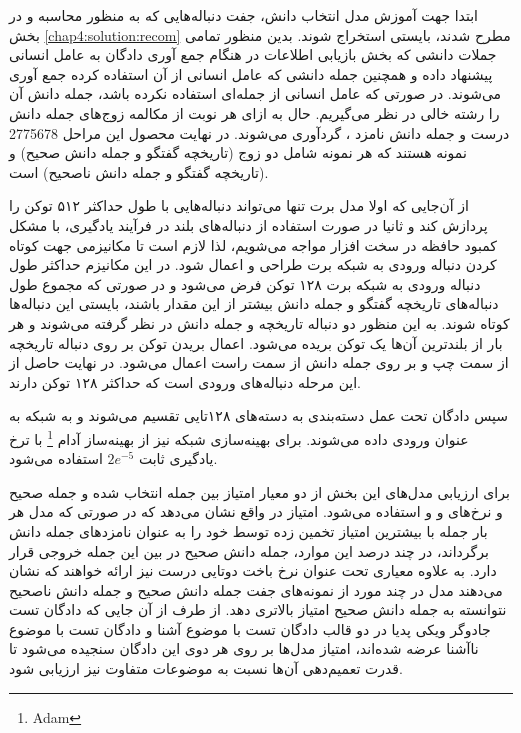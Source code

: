  ابتدا جهت آموزش مدل انتخاب دانش،‌ جفت دنباله‌هایی که به منظور محاسبه 
 و
 در بخش 
 \ref{chap4:solution:recom}
 مطرح شدند، بایستی استخراج شوند. بدین منظور تمامی جملات دانشی که بخش بازیابی اطلاعات در هنگام جمع آوری دادگان به عامل انسانی پیشنهاد داده و همچنین جمله دانشی که عامل انسانی از آن استفاده کرده جمع آوری می‌شوند. در صورتی که عامل انسانی از جمله‌ای استفاده نکرده باشد،‌ جمله دانش آن را رشته خالی در نظر می‌گیریم. حال به ازای هر نوبت از مکالمه زوج‌های جمله دانش درست و جمله دانش نامزد ، گردآوری می‌شوند. در نهایت محصول این مراحل 2775678 نمونه هستند که هر نمونه شامل دو زوج (تاریخچه گفتگو و جمله دانش صحیح) و (تاریخچه گفتگو و جمله دانش ناصحیح) است. 
 

از آن‌جایی که اولا مدل برت تنها می‌تواند دنباله‌هایی با طول حداکثر ۵۱۲ توکن را پردازش کند و ثانیا در صورت استفاده از دنباله‌های بلند در فرآیند یادگیری، با مشکل کمبود حافظه در سخت افزار مواجه می‌شویم، لذا لازم است تا مکانیزمی جهت کوتاه کردن دنباله ورودی به شبکه برت طراحی و اعمال شود. در این مکانیزم حداکثر طول دنباله ورودی به شبکه برت ۱۲۸ توکن فرض می‌شود و در صورتی که مجموع طول دنباله‌های تاریخچه گفتگو و جمله دانش بیشتر از این مقدار باشند، بایستی این دنباله‌ها کوتاه شوند. به این منظور دو دنباله تاریخچه و جمله دانش در نظر گرفته می‌شوند و هر بار از بلندترین آن‌ها یک توکن بریده می‌شود. اعمال بریدن توکن بر روی دنباله تاریخچه از سمت چپ و بر روی جمله دانش از سمت راست اعمال می‌شود. در نهایت حاصل از این مرحله دنباله‌های ورودی است که حداکثر ۱۲۸ توکن دارند. 

سپس دادگان تحت عمل دسته‌بندی به دسته‌های ۱۲۸تایی تقسیم می‌شوند و به شبکه به عنوان ورودی داده می‌شوند. برای بهینه‌سازی شبکه نیز از بهینه‌ساز آدام
\footnote{Adam}
با ترخ یادگیری ثابت 
$2e^{-5}$
استفاده می‌شود.

برای ارزیابی مدل‌های این بخش از دو معیار امتیاز
بین جمله انتخاب شده و جمله صحیح
و نرخ‌های 
 و  و 
استفاده می‌شود. امتیاز
در واقع نشان می‌دهد که در صورتی که مدل هر بار 
جمله  با بیشترین امتیاز تخمین زده توسط خود را به عنوان نامزد‌های جمله دانش برگرداند، در چند درصد این موارد، جمله دانش صحیح در بین این 
جمله خروجی قرار دارد. 
به علاوه معیاری تحت عنوان نرخ باخت دوتایی درست نیز ارائه خواهند که نشان می‌دهند مدل در چند مورد از نمونه‌های جفت جمله دانش صحیح و جمله دانش ناصحیح نتوانسته به جمله دانش صحیح امتیاز بالاتری دهد. 
از طرف از آن‌ جایی که دادگان تست جادوگر ویکی پدیا در دو قالب دادگان تست با موضوع آشنا و دادگان تست با موضوع ناآشنا عرضه شده‌اند، امتیاز مدل‌ها بر روی هر دوی این دادگان سنجیده می‌شود تا قدرت تعمیم‌دهی آن‌ها نسبت به موضوعات متفاوت نیز ارزیابی شود.  

